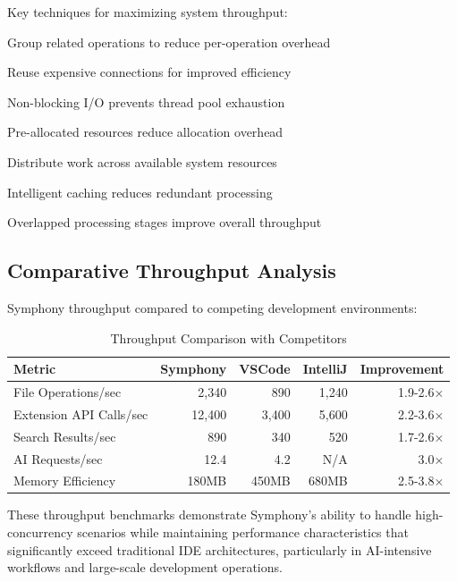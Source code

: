 Key techniques for maximizing system throughput:

\begin{description}[leftmargin=4cm,labelwidth=3.5cm]
\item[\textbf{Batch Processing}] Group related operations to reduce per-operation overhead
\item[\textbf{Connection Pooling}] Reuse expensive connections for improved efficiency
\item[\textbf{Async Operations}] Non-blocking I/O prevents thread pool exhaustion
\item[\textbf{Resource Pooling}] Pre-allocated resources reduce allocation overhead
\item[\textbf{Load Balancing}] Distribute work across available system resources
\item[\textbf{Caching Strategies}] Intelligent caching reduces redundant processing
\item[\textbf{Pipeline Optimization}] Overlapped processing stages improve overall throughput
\end{description}

\subsection*{Comparative Throughput Analysis}

Symphony throughput compared to competing development environments:

\begin{table}[ht]
\centering
\caption{Throughput Comparison with Competitors}
\label{tab:competitive-throughput}
\begin{tabular}{@{}lrrrr@{}}
\toprule
\textbf{Metric} & \textbf{Symphony} & \textbf{VSCode} & \textbf{IntelliJ} & \textbf{Improvement} \\
\midrule
File Operations/sec & 2,340 & 890 & 1,240 & 1.9-2.6× \\
Extension API Calls/sec & 12,400 & 3,400 & 5,600 & 2.2-3.6× \\
Search Results/sec & 890 & 340 & 520 & 1.7-2.6× \\
AI Requests/sec & 12.4 & 4.2 & N/A & 3.0× \\
Memory Efficiency & 180MB & 450MB & 680MB & 2.5-3.8× \\
\bottomrule
\end{tabular}
\end{table}

These throughput benchmarks demonstrate Symphony's ability to handle high-concurrency scenarios while maintaining performance characteristics that significantly exceed traditional IDE architectures, particularly in AI-intensive workflows and large-scale development operations.
